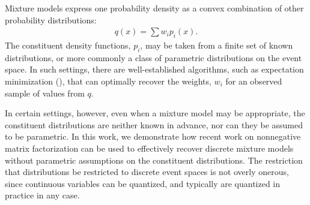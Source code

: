 \documentclass[conference]{IEEEtran}
\title{\vspace{-0.25em}\thetitle}
\author{
{\large{Stefan~Karpinski, John~R.~Gilbert, Elizabeth~M.~Belding}} \vspace{0.25em}\\
Department of Computer Science \\
University of California, Santa Barbara \vspace{0.35em}\\
\textit{\{sgk,gilbert,ebelding\}@cs.ucsb.edu}
}
\begin{document}
\maketitle

Mixture models express one probability density as a convex combination of other probability distributions:
\begin{align}
  q(x) = \sum w_i p_i(x).
\end{align}
The constituent density functions, $p_i$, may be taken from a finite set of known distributions, or more commonly a class of parametric distributions on the event space.
In such settings, there are well-established algorithms, such as expectation minimization (), that can optimally recover the weights, $w_i$ for an observed sample of values from $q$.

In certain settings, however, even when a mixture model may be appropriate, the constituent distributions are neither known in advance, nor can they be assumed to be parametric.
In this work, we demonstrate how recent work on nonnegative matrix factorization can be used to effectively recover discrete mixture models without parametric assumptions on the constituent distributions.
The restriction that distributions be restricted to discrete event spaces is not overly onerous, since continuous variables can be quantized, and typically are quantized in practice in any case.
\end{document}
